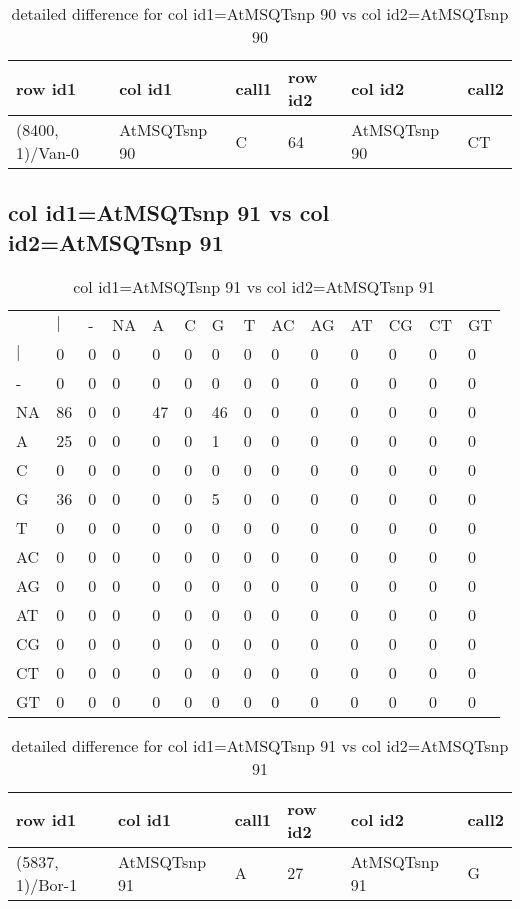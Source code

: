 \begin{center}
\begin{longtable}{|l|l|l|l|l|l|}
\caption{detailed difference for col id1=AtMSQTsnp 90 vs col id2=AtMSQTsnp 90} \label{table_dm785}\\
\hline
row id1&col id1&call1&row id2&col id2&call2\\
\hline
(8400, 1)/Van-0&AtMSQTsnp 90&C&64&AtMSQTsnp 90&CT\\
\hline
\end{longtable}
\end{center}

\subsection{col id1=AtMSQTsnp 91 vs col id2=AtMSQTsnp 91}
\begin{center}
\begin{longtable}{|l|l|l|l|l|l|l|l|l|l|l|l|l|l|}
\caption{col id1=AtMSQTsnp 91 vs col id2=AtMSQTsnp 91} \label{table_dm786}\\
\hline
\\
\hline
&$|$&-&NA&A&C&G&T&AC&AG&AT&CG&CT&GT\\
$|$&0&0&0&0&0&0&0&0&0&0&0&0&0\\
-&0&0&0&0&0&0&0&0&0&0&0&0&0\\
NA&86&0&0&47&0&46&0&0&0&0&0&0&0\\
A&25&0&0&0&0&1&0&0&0&0&0&0&0\\
C&0&0&0&0&0&0&0&0&0&0&0&0&0\\
G&36&0&0&0&0&5&0&0&0&0&0&0&0\\
T&0&0&0&0&0&0&0&0&0&0&0&0&0\\
AC&0&0&0&0&0&0&0&0&0&0&0&0&0\\
AG&0&0&0&0&0&0&0&0&0&0&0&0&0\\
AT&0&0&0&0&0&0&0&0&0&0&0&0&0\\
CG&0&0&0&0&0&0&0&0&0&0&0&0&0\\
CT&0&0&0&0&0&0&0&0&0&0&0&0&0\\
GT&0&0&0&0&0&0&0&0&0&0&0&0&0\\
\hline
\end{longtable}
\end{center}

\begin{center}
\begin{longtable}{|l|l|l|l|l|l|}
\caption{detailed difference for col id1=AtMSQTsnp 91 vs col id2=AtMSQTsnp 91} \label{table_dm787}\\
\hline
row id1&col id1&call1&row id2&col id2&call2\\
\hline
(5837, 1)/Bor-1&AtMSQTsnp 91&A&27&AtMSQTsnp 91&G\\
\hline
\end{longtable}
\end{center}


